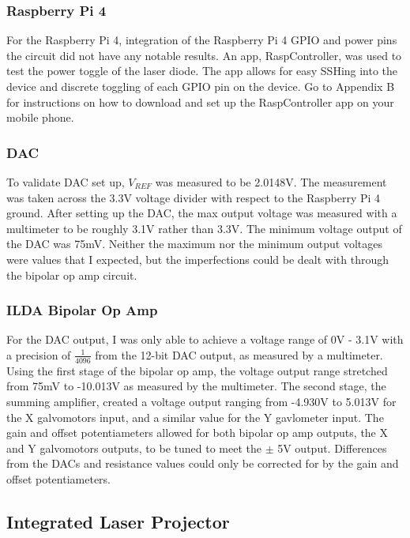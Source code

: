 \documentclass[journal]{IEEEtran}
\begin{document}
    \subsubsection{Raspberry Pi 4}

    For the Raspberry Pi 4, integration of the Raspberry Pi 4 GPIO and power pins the circuit did not have any notable results.
    An app, RaspController, was used to test the power toggle of the laser diode. 
    The app allows for easy SSHing into the device and discrete toggling of each GPIO pin on the device.
    Go to Appendix B for instructions on how to download and set up the RaspController app on your mobile phone. 

    \subsubsection{DAC}

    To validate DAC set up, $V_{REF}$ was measured to be 2.0148V.
    The measurement was taken across the 3.3V voltage divider with respect to the Raspberry Pi 4 ground.
    After setting up the DAC, the max output voltage was measured with a multimeter to be roughly 3.1V rather than 3.3V. 
    The minimum voltage output of the DAC was 75mV.
    Neither the maximum nor the minimum output voltages were values that I expected, but the imperfections could be dealt with through the bipolar op amp circuit.

    \subsubsection{ILDA Bipolar Op Amp}
    For the DAC output, I was only able to achieve a voltage range of 0V - 3.1V with a precision of $\frac{1}{4096}$ from the 12-bit DAC output, as measured by a multimeter.
    Using the first stage of the bipolar op amp, the voltage output range stretched from 75mV to -10.013V as measured by the multimeter.
    The second stage, the summing amplifier, created a voltage output ranging from -4.930V to 5.013V for the X galvomotors input, and a similar value for the Y gavlometer input.
    The gain and offset potentiameters allowed for both bipolar op amp outputs, the X and Y galvomotors outputs, to be tuned to meet the $\pm$ 5V output.
    Differences from the DACs and resistance values could only be corrected for by the gain and offset potentiameters.

    \subsection{Integrated Laser Projector}
    
\end{document}
